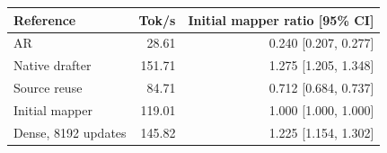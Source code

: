 \begin{tabular}{lrr}
\toprule
Reference & Tok/s & Initial mapper ratio [95\% CI] \\
\midrule
AR & 28.61 & 0.240 [0.207, 0.277] \\
Native drafter & 151.71 & 1.275 [1.205, 1.348] \\
Source reuse & 84.71 & 0.712 [0.684, 0.737] \\
Initial mapper & 119.01 & 1.000 [1.000, 1.000] \\
Dense, 8192 updates & 145.82 & 1.225 [1.154, 1.302] \\
\bottomrule
\end{tabular}
